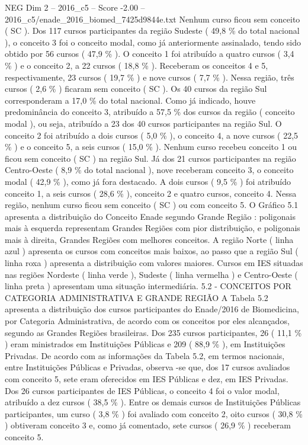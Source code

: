 \begin{textsample}{NEG Dim 2 – 2016\_c5 – Score -2.00 – 2016\_c5/enade\_2016\_biomed\_7425d9844e.txt}
Nenhum curso ficou sem conceito ( SC ).
Dos 117 cursos participantes da região Sudeste ( 49,8 \% do total nacional ), o conceito 3 foi o conceito modal, como já anteriormente assinalado, tendo sido obtido por 56 cursos ( 47,9 \% ).
O conceito 1 foi atribuído a quatro cursos ( 3,4 \% ) e o conceito 2, a 22 cursos ( 18,8 \% ).
Receberam os conceitos 4 e 5, respectivamente, 23 cursos ( 19,7 \% ) e nove cursos ( 7,7 \% ).
Nessa região, três cursos ( 2,6 \% ) ficaram sem conceito ( SC ).
Os 40 cursos da região Sul corresponderam a 17,0 \% do total nacional.
Como já indicado, houve predominância do conceito 3, atribuído a 57,5 \% dos cursos da região ( conceito modal ), ou seja, atribuído a 23 dos 40 cursos participantes na região Sul.
O conceito 2 foi atribuído a dois cursos ( 5,0 \% ), o conceito 4, a nove cursos ( 22,5 \% ) e o conceito 5, a seis cursos ( 15,0 \% ).
Nenhum curso recebeu conceito 1 ou ficou sem conceito ( SC ) na região Sul.
Já dos 21 cursos participantes na região Centro-Oeste ( 8,9 \% do total nacional ), nove receberam conceito 3, o conceito modal ( 42,9 \% ), como já fora destacado.
A dois cursos ( 9,5 \% ) foi atribuído conceito 1, a seis cursos ( 28,6 \% ), conceito 2 e quatro cursos, conceito 4.
Nessa região, nenhum curso ficou sem conceito ( SC ) ou com conceito 5.
O Gráfico 5.1 apresenta a distribuição do Conceito Enade segundo Grande Região : poligonais mais à esquerda representam Grandes Regiões com pior distribuição, e poligonais mais à direita, Grandes Regiões com melhores conceitos.
A região Norte ( linha azul ) apresenta os cursos com conceitos mais baixos, ao passo que a região Sul ( linha roxa ) apresenta a distribuição com valores maiores.
Cursos em IES situadas nas regiões Nordeste ( linha verde ), Sudeste ( linha vermelha ) e Centro-Oeste ( linha preta ) apresentam uma situação intermediária. 5.2 - CONCEITOS POR CATEGORIA ADMINISTRATIVA E GRANDE REGIÃO A Tabela 5.2 apresenta a distribuição dos cursos participantes do Enade/2016 de Biomedicina, por Categoria Administrativa, de acordo com os conceitos por eles alcançados, segundo as Grandes Regiões brasileiras.
Dos 235 cursos participantes, 26 ( 11,1 \% ) eram ministrados em Instituições Públicas e 209 ( 88,9 \% ), em Instituições Privadas.
De acordo com as informações da Tabela 5.2, em termos nacionais, entre Instituições Públicas e Privadas, observa -se que, dos 17 cursos avaliados com conceito 5, sete eram oferecidos em IES Públicas e dez, em IES Privadas.
Dos 26 cursos participantes de IES Públicas, o conceito 4 foi o valor modal, atribuído a dez cursos ( 38,5 \% ).
Entre os demais cursos de Instituições Públicas participantes, um curso ( 3,8 \% ) foi avaliado com conceito 2, oito cursos ( 30,8 \% ) obtiveram conceito 3 e, como já comentado, sete cursos ( 26,9 \% ) receberam conceito 5.

\end{textsample}
